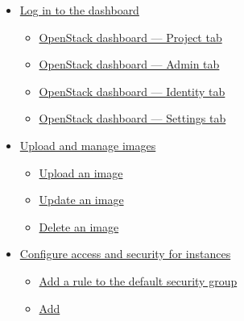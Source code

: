 \documentclass[a4paper]{article}
\begin{document}
\begin{itemize}
    \item \href{https://docs.openstack.org/horizon/pike/user/log-in.html}{Log in to the dashboard}
          \begin{itemize}
              \item \href{https://docs.openstack.org/horizon/pike/user/log-in.html#openstack-dashboard-project-tab}{OpenStack
                        dashboard — Project tab}
              \item \href{https://docs.openstack.org/horizon/pike/user/log-in.html#openstack-dashboard-admin-tab}{OpenStack dashboard
                        — Admin tab}
              \item \href{https://docs.openstack.org/horizon/pike/user/log-in.html#openstack-dashboard-identity-tab}{OpenStack
                        dashboard — Identity tab}
              \item \href{https://docs.openstack.org/horizon/pike/user/log-in.html#openstack-dashboard-settings-tab}{OpenStack
                        dashboard — Settings tab}
          \end{itemize}
    \item \href{https://docs.openstack.org/horizon/pike/user/manage-images.html}{Upload and manage images}
          \begin{itemize}
              \item \href{https://docs.openstack.org/horizon/pike/user/manage-images.html#upload-an-image}{Upload an image}
              \item \href{https://docs.openstack.org/horizon/pike/user/manage-images.html#update-an-image}{Update an image}
              \item \href{https://docs.openstack.org/horizon/pike/user/manage-images.html#delete-an-image}{Delete an image}
          \end{itemize}
    \item \href{https://docs.openstack.org/horizon/pike/user/configure-access-and-security-for-instances.html}{Configure
              access and security for instances}
          \begin{itemize}
              \item
                    \href{https://docs.openstack.org/horizon/pike/user/configure-access-and-security-for-instances.html#add-a-rule-to-the-default-security-group}{Add a rule to the default security group}
              \item
                    \href{https://docs.openstack.org/horizon/pike/user/configure-access-and-security-for-instances.html#add-a-key-pair}{Add
}
\end{itemize}
\end{itemize}
\end{document}
